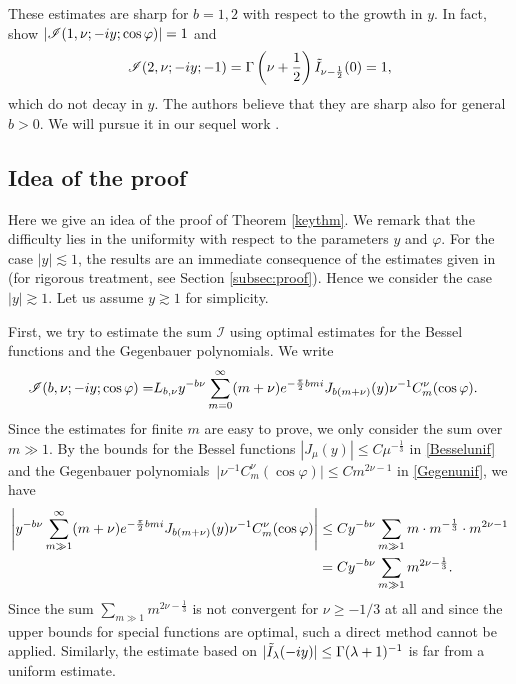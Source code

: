 \documentclass[10pt,a4paper]{article}
\numberwithin{equation}{section}
\def\f{\varphi}
\def\m{\mu}
\def\n{\nu}
\newcommand{\sI}{\mathscr{I}}
\begin{document}
\begin{Remark}\label{dispremark}
These estimates are sharp for $b=1,2$ with respect to the growth in $y$. In fact, \cite[equations~(4.45), (4,46)]{BKO} show $|\sI(1,\nu;-{\rm i}y;\cos\f)|=1$ and
\[
\sI(2,\nu;-{\rm i}y;-1)=\Gamma\left(\n+\frac{1}{2}\right)\tilde{I}_{\n-\frac{1}{2}}(0)=1,
\]
 which do not decay in $y$. The authors believe that they are sharp also for general $b>0$. We will pursue it in our sequel work \cite{TT}.
\end{Remark}

\subsection{Idea of the proof}

Here we give an idea of the proof of Theorem \ref{keythm}. We remark that the difficulty lies in the uniformity with respect to the parameters $y$ and $\f$. For the case $|y|\lesssim 1$, the results are an immediate consequence of the estimates given in \cite{BKO} (for rigorous treatment, see Section \ref{subsec:proof}). Hence we consider the case $|y|\gtrsim 1$. Let us assume $y\gtrsim 1$ for simplicity.

First, we try to estimate the sum $\sI$ using optimal estimates for the Bessel functions and the Gegenbauer polynomials. We write
\begin{align*}
\sI(b,\nu;- {\rm i}y;\cos\f)=&L_{b,\n}y^{-b\n}\sum_{m=0}^{\infty}(m+\nu){\rm e}^{-\frac{\pi}{2}bm {\rm i}}J_{b(m+\n)}(y)\n^{-1}C^{\nu}_m(\cos\f).
\end{align*}
Since the estimates for finite $m$ are easy to prove, we only consider the sum over $m\gg 1$.
By the bounds for the Bessel functions $|J_{\m}(y)|\leq C\m^{-\frac{1}{3}}$ in \eqref{Besselunif} and the Gegenbauer polynomials~${\big|\n^{-1}C_m^{\n}(\cos \f)\big|\leq Cm^{2\n-1}}$ in \eqref{Gegenunif}, we have
\begin{align*}
\left|y^{-b\n}\sum_{m\gg 1}^{\infty}(m+\nu){\rm e}^{-\frac{\pi}{2}bm {\rm i}}J_{b(m+\n)}(y)\n^{-1}C^{\nu}_m(\cos\f)\right|\leq{}& Cy^{-b\n}\sum_{m\gg 1}m\cdot m^{-\frac{1}{3}}\cdot m^{2\n-1}\\
={}&Cy^{-b\n}\sum_{m\gg 1}m^{2\n-\frac{1}{3}}.
\end{align*}
Since the sum $\sum_{m\gg 1}m^{2\n-\frac{1}{3}}$ is not convergent for $\n\ge -1/3$ at all and since the upper bounds for special functions are optimal, such a direct method cannot be applied. Similarly, the estimate based on %
$|\tilde{I}_{\lambda}(-{\rm i}y)|\le \Gamma(\lambda+1)^{-1}$
is far from a uniform estimate.
\end{document}
